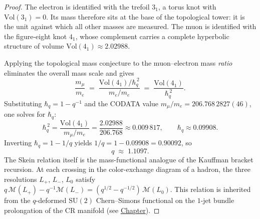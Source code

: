 \begin{proof}
The electron is identified with the trefoil $3_1$, a torus knot with
$\mathrm{Vol}(3_1) = 0$. Its mass therefore sits at the base of the
topological tower: it is the unit against which all other masses are measured.
The muon is identified with the figure-eight knot $4_1$, whose complement
carries a complete hyperbolic structure of volume
$\mathrm{Vol}(4_1) \approx 2.02988$.

Applying the topological mass conjecture to the muon--electron mass
\emph{ratio} eliminates the overall mass scale and gives
\[
\frac{m_\mu}{m_e}
  \;=\;
  \frac{\mathrm{Vol}(4_1) / \hbar_q^{\,2}}{m_e / m_e}
  \;=\;
  \frac{\mathrm{Vol}(4_1)}{\hbar_q^{\,2}}.
\]
Substituting $\hbar_q = 1 - q^{-1}$ and the CODATA value
$m_\mu / m_e = 206.768\,2827(46)$, one solves for $\hbar_q$:
\[
\hbar_q^{\,2}
  = \frac{\mathrm{Vol}(4_1)}{m_\mu / m_e}
  = \frac{2.02988}{206.768}
  \approx 0.009\,817,
  \qquad
  \hbar_q \approx 0.09908.
\]
Inverting $\hbar_q = 1 - 1/q$ yields
$1/q = 1 - 0.09908 = 0.90092$, so
\[
q \;\approx\; 1.1097.
\]
The Skein relation itself is the mass-functional analogue of the Kauffman
bracket recursion. At each crossing in the color-exchange diagram of a
hadron, the three resolutions $L_+$, $L_-$, $L_0$ satisfy
$q\,\mathcal{M}(L_+) - q^{-1}\mathcal{M}(L_-) =
(q^{1/2}-q^{-1/2})\,\mathcal{M}(L_0)$. This relation is inherited from the
$q$-deformed $\mathrm{SU}(2)$ Chern--Simons functional on the
$1$-jet bundle prolongation of the CR manifold
(see \hyperref[chap:path-integrals-braiding]{Chapter}).
\end{proof}

